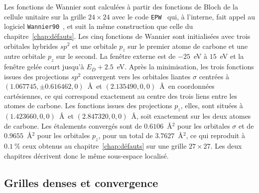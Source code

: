Les fonctions de Wannier sont calculées à partir des fonctions de Bloch de la cellule unitaire sur la grille $24\times 24$ avec le code \texttt{EPW}~\cite{ponceEPWElectronphononCoupling2016,leeElectronPhononPhysics2023a} qui, à l'interne, fait appel au logiciel \texttt{Wannier90}~\cite{mostofiWannier90ToolObtaining2008,mostofiUpdatedVersionWannier902014,pizziWannier90CommunityCode2020}, et suit la même construction que celle du chapitre~\ref{chap:défauts}. Les cinq fonctions de Wannier sont initialisées avec trois orbitales hybrides $sp^2$ et une orbitale $p_z$ sur le premier atome de carbone et une autre orbitale $p_z$ sur le second. La fenêtre externe est de $-25$~eV à $15$~eV et la fenêtre gelée court jusqu'à $E_D+2.5$~eV. Après la minimisation, les trois fonctions issues des projections $sp^2$ convergent vers les orbitales liantes $\sigma$ centrées à $(1.067745, \pm0.616462, 0)$~\AA~et $(2.135490, 0, 0)$~\AA~en coordonnées cartésiennes, ce qui correspond exactement au centre des trois liens entre les atomes de carbone. Les fonctions issues des projections $p_z$, elles, sont situées à $(1.423660, 0, 0)$~\AA~et $(2.847320, 0, 0)$~\AA{}, soit exactement sur les deux atomes de carbone. Les étalements convergés sont de $0.6106$~\AA$^2$ pour les orbitales $\sigma$ et de $0.9655$~\AA$^2$ pour les orbitales $p_z$, pour un total de $3.7627$~\AA$^2$, ce qui reproduit à $0.1~\%$ ceux obtenus au chapitre~\ref{chap:défauts} sur une grille $27\times 27$. Les deux chapitres décrivent donc le même sous-espace localisé.

\subsection{Grilles denses et convergence}

